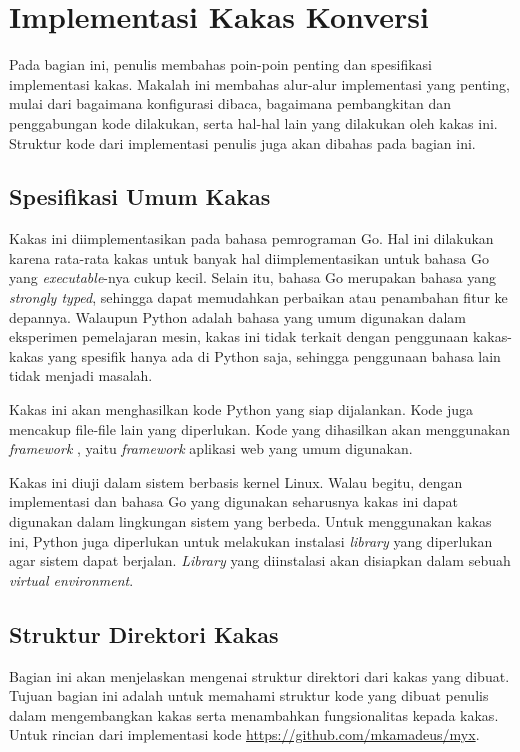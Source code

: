\section{Implementasi Kakas Konversi}

Pada bagian ini, penulis membahas poin-poin penting dan spesifikasi implementasi kakas.
Makalah ini membahas alur-alur implementasi yang penting, mulai dari bagaimana konfigurasi dibaca, bagaimana pembangkitan dan penggabungan kode dilakukan, serta hal-hal lain yang dilakukan oleh kakas ini.
Struktur kode dari implementasi penulis juga akan dibahas pada bagian ini.

\subsection{Spesifikasi Umum Kakas}

Kakas ini diimplementasikan pada bahasa pemrograman Go.
Hal ini dilakukan karena rata-rata kakas untuk banyak hal diimplementasikan untuk bahasa Go yang \textit{executable}-nya cukup kecil.
Selain itu, bahasa Go merupakan bahasa yang \textit{strongly typed}, sehingga dapat memudahkan perbaikan atau penambahan fitur ke depannya.
Walaupun Python adalah bahasa yang umum digunakan dalam eksperimen pemelajaran mesin, kakas ini tidak terkait dengan penggunaan kakas-kakas yang spesifik hanya ada di Python saja, sehingga penggunaan bahasa lain tidak menjadi masalah.

Kakas ini akan menghasilkan kode Python yang siap dijalankan.
Kode juga mencakup file-file lain yang diperlukan.
Kode yang dihasilkan akan menggunakan \textit{framework} , yaitu \textit{framework} aplikasi web yang umum digunakan.

Kakas ini diuji dalam sistem berbasis kernel Linux.
Walau begitu, dengan implementasi dan bahasa Go yang digunakan seharusnya kakas ini dapat digunakan dalam lingkungan sistem yang berbeda.
Untuk menggunakan kakas ini, Python juga diperlukan untuk melakukan instalasi \textit{library} yang diperlukan agar sistem dapat berjalan.
\textit{Library} yang diinstalasi akan disiapkan dalam sebuah \textit{virtual environment}.

\subsection{Struktur Direktori Kakas}

Bagian ini akan menjelaskan mengenai struktur direktori dari kakas yang dibuat.
Tujuan bagian ini adalah untuk memahami struktur kode yang dibuat penulis dalam mengembangkan kakas serta menambahkan fungsionalitas kepada kakas.
Untuk rincian dari implementasi kode \url{https://github.com/mkamadeus/myx}.

